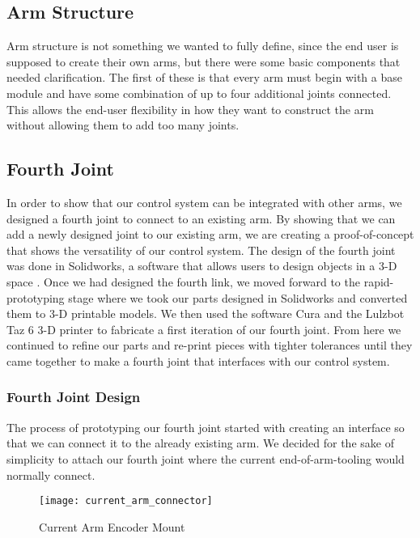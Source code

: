 \subsection{Arm Structure}
Arm structure is not something we wanted to fully define, since the end user is supposed to create their own arms, but there were some basic components that needed clarification. The first of these is that every arm must begin with a base module and have some combination of up to four additional joints connected.  This allows the end-user flexibility in how they want to construct the arm without allowing them to add too many joints.

\subsection{Fourth Joint}
In order to show that our control system can be integrated with other arms, we designed a fourth joint to connect to an existing arm. By showing that we can add a newly designed joint to our existing arm, we are creating a proof-of-concept that shows the versatility of our control system.  The design of the fourth joint was done in Solidworks, a software that allows users to design objects in a 3-D space \cite{Solidworks}. Once we had designed the fourth link, we moved forward to the rapid-prototyping stage where we took our parts designed in Solidworks and converted them to 3-D printable models.  We then used the software Cura \cite{Cura} and the Lulzbot Taz 6 3-D printer \cite{Taz6} to fabricate a first iteration of our fourth joint.  From here we continued to refine our parts and re-print pieces with tighter tolerances until they came together to make a fourth joint that interfaces with our control system.

\subsubsection{Fourth Joint Design}
The process of prototyping our fourth joint started with creating an interface so that we can connect it to the already existing arm.  We decided for the sake of simplicity to attach our fourth joint where the current end-of-arm-tooling would normally connect. \\

\begin{figure}[H]
	\centering
	\texttt{[image: current\_arm\_connector]}
	\caption{Current Arm Encoder Mount}
	\label{Current Arm Encoder Mount}
\end{figure}

